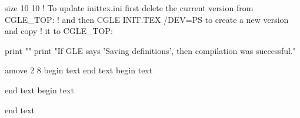size 10 10
! To update inittex.ini first delete the current version from CGLE_TOP:
! and then  CGLE INIT.TEX /DEV=PS to create a new version and copy
! it to CGLE_TOP:

print ""
print "If GLE says 'Saving definitions', then compilation was successful."

amove 2 8
begin text
      
    
    
    
end text
begin text
\mathcode{[}{$405B}
\mathcode{]}{$505D}

end text
begin text
\delcode{[}{$05B302}
\delcode{]}{$05D303}

\def\lbrack{[} \def\rbrack{]}
\def\space{ }

\def\,{\movexy{0.5em}{0}}
\def\:{\movexy{1em}{0}}
\def\;{\movexy{2em}{0}}
\def\!{\movexy{-0.5em}{0}}

\def\smallskip{\vskip{2 ex}}            %
\def\medskip{\vskip{4 ex}}              %
\def\bigskip{\vskip{8 ex}}              %

\def\ss{\char{$19}}
\def\ae{\char{$1A}}
\def\oe{\char{$1b}}
\def\o{\char{$1c}}
\def\AE{\char{$1d}}
\def\OE{\char{$1e}}
\def\O{\char{$1f}}
\def\i{\char{$10}}
\def\j{\char{$11}}
\def\l{\char{248}}
\def\L{\char{232}}

\def\adobess{\char{251}}
\def\adobeae{\char{241}}
\def\adobeoe{\char{250}}
\def\adobeAE{\char{225}}
\def\adobeOE{\char{234}}
\def\adobeo{\char{249}}
\def\adobeO{\char{233}}
\def\adobei{\char{245}}
\def\adobesterlin{\char{163}}
\def\adobeyen{\char{165}}
\def\adobeflorin{\char{166}}
\def\adobesection{\char{167}}
\def\adobecurrency{\char{168}}

\def\degree{\char{202}}

\def\dag{\mathchar{$279}}
\def\ddag{\mathchar{$27A}}
\def\S{\mathchar{$278}}
\def\P{\mathchar{$27B}}
end text

